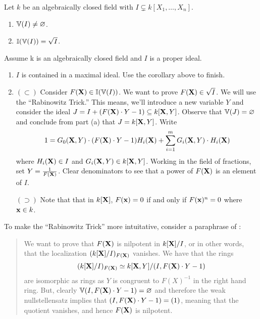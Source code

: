 \documentclass{ximera}
\begin{document}
\begin{theorem}[Nullstellensatz]
  Let $k$ be an algebraically closed field with $I \subsetneq k[X_1,\dots,X_n]$.
  \begin{enumerate}
  \item $\mathbb V(I) \ne \varnothing$.
  \item $\mathbb I(\mathbb V(I)) = \sqrt{I}$.
  \end{enumerate}
\begin{sketch}
Assume k is an algebraically closed field and $I$ is a proper ideal.
  \begin{enumerate}
    \item $I$ is contained in a maximal ideal. Use the corollary above
      to finish.
    \item $(\subset)$ Consider $F(\mathbf X)\in\mathbb I(\mathbb V(I))$. We want to prove
      $F(\mathbf X)\in\sqrt{I}$. We will use the ``Rabinowitz Trick.'' This
      means, we'll introduce a new variable $Y$ and consider the ideal
      $J= I + (F(\mathbf X)\cdot Y-1)\subseteq k[\mathbf X,Y]$. Observe that $\mathbb V(J) =
      \varnothing$ and conclude from part (a) that $J=k[\mathbf X,Y]$. Write
      \[
      1= G_0(\mathbf X,Y)\cdot (F(\mathbf X)\cdot Y-1) H_i(\mathbf X) + \sum_{i=1}^m G_i(\mathbf X,Y)
      \cdot H_i(\mathbf X)
      \]
      where $H_i(\mathbf X) \in I$ and $G_i(\mathbf X,Y) \in k[\mathbf X,Y]$.  Working in
      the field of fractions, set $Y=\frac{1}{F(\mathbf X)}$. Clear
      denominators to see that a power of $F(\mathbf X)$ is an element of $I$.

      $(\supset)$ Note that that in $k[\mathbf X]$, $F(\mathbf{x}) = 0$ if and only
      if $F(\mathbf{x})^n = 0$ where $\mathbf{x}\in k$.
  \end{enumerate}
\end{sketch}
\end{theorem}

\begin{remark}%
  To make the ``Rabinowitz Trick'' more intuitative, consider a
  paraphrase of :
\begin{quote}
  We want to prove that $F(\mathbf X)$ is nilpotent in $k[\mathbf X]/I$, or in other
  words, that the localization $(k[\mathbf X]/I)_{F(\mathbf X)}$ vanishes. We have that the rings
  \[
  (k[\mathbf X]/I)_{F(\mathbf X)}\simeq k[\mathbf X,Y]/(I,F(\mathbf X)\cdot Y-1)
  \]
  are isomorphic as rings as $Y$ is congruent to $F(X)^{-1}$ in the
  right hand ring.  But, clearly $\mathbb V(I,F(\mathbf X)\cdot Y-1)=\varnothing$ and
  therefore the weak nullstellensatz implies that $(I,F(\mathbf X)\cdot
  Y-1)=(1)$, meaning that the quotient vanishes, and hence $F(\mathbf X)$ is
  nilpotent.
\end{quote}
\end{remark}
\end{document}

